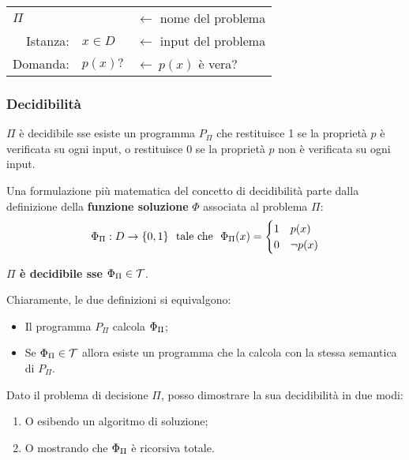 \begin{tabular}{|r l|l}\cline{1-2}
    \multicolumn{2}{|l|}{$\Pi$}&$\leftarrow$ nome del problema\\
    Istanza:& $x\in D$&$\leftarrow $ input del problema\\
    Domanda:& $p(x)?$&$\leftarrow \ p(x)$ è vera? \\ \cline{1-2}
\end{tabular}

\subsubsection{Decidibilità}
\begin{minipage}{.33\textwidth}
\end{minipage}
\begin{minipage}{.65\textwidth}
    $\Pi$ è decidibile sse esiste un programma $P_\Pi$ che restituisce 1 se
    la proprietà $p$ è verificata su ogni input, o restituisce 0 se 
    la proprietà $p$ non è verificata su ogni input.
\end{minipage}
\vspace{1em}

Una formulazione più matematica del concetto di decidibilità parte dalla definizione
della \textbf{funzione soluzione} $\Phi$ associata al problema  $\Pi$:
$$ \Phi_{\Pi}:D\to\{0,1\}\ \text{ tale che }\
\Phi_{\Pi}(x) = \begin{cases}
    1 & p(x)\\
    0 & \lnot p(x)
\end{cases} $$

\textbf{$\Pi$ è decidibile sse $\Phi_{\Pi}\in\mathcal{T}$}.

Chiaramente, le due definizioni si equivalgono:
\begin{itemize}
    \item Il programma $P_\Pi$ calcola $\Phi_{\Pi}$;
    \item Se $\Phi_{\Pi}\in\mathcal{T}$ allora esiste un programma che la calcola con la
        stessa semantica di $P_\Pi$.
\end{itemize}
\vspace{1em}

Dato il problema di decisione $\Pi$, posso dimostrare la sua decidibilità in due modi:
\begin{enumerate}
    \item O esibendo un algoritmo di soluzione;
    \item O mostrando che $\Phi_{\Pi}$ è ricorsiva totale. 
\end{enumerate}

